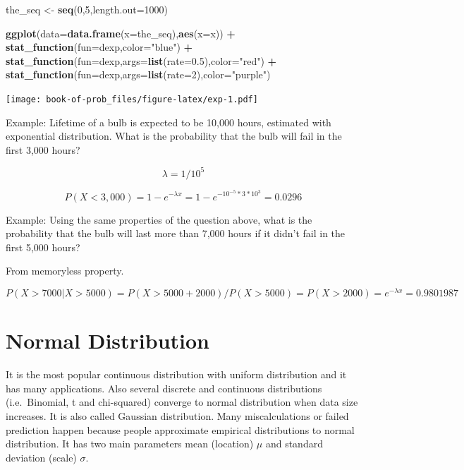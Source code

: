 \documentclass[]{book}
\newenvironment{Shaded}{\begin{snugshade}}{\end{snugshade}}
\newcommand{\DataTypeTok}[1]{\textcolor[rgb]{0.13,0.29,0.53}{#1}}
\newcommand{\DecValTok}[1]{\textcolor[rgb]{0.00,0.00,0.81}{#1}}
\newcommand{\FloatTok}[1]{\textcolor[rgb]{0.00,0.00,0.81}{#1}}
\newcommand{\KeywordTok}[1]{\textcolor[rgb]{0.13,0.29,0.53}{\textbf{#1}}}
\newcommand{\NormalTok}[1]{#1}
\newcommand{\OperatorTok}[1]{\textcolor[rgb]{0.81,0.36,0.00}{\textbf{#1}}}
\newcommand{\StringTok}[1]{\textcolor[rgb]{0.31,0.60,0.02}{#1}}
\theoremstyle{definition}
\theoremstyle{definition}
\theoremstyle{definition}
\theoremstyle{remark}
\begin{document}
\begin{Shaded}
\begin{Highlighting}[]
\NormalTok{the_seq <-}\StringTok{ }\KeywordTok{seq}\NormalTok{(}\DecValTok{0}\NormalTok{,}\DecValTok{5}\NormalTok{,}\DataTypeTok{length.out=}\DecValTok{1000}\NormalTok{)}

\KeywordTok{ggplot}\NormalTok{(}\DataTypeTok{data=}\KeywordTok{data.frame}\NormalTok{(}\DataTypeTok{x=}\NormalTok{the_seq),}\KeywordTok{aes}\NormalTok{(}\DataTypeTok{x=}\NormalTok{x)) }\OperatorTok{+}
\KeywordTok{stat_function}\NormalTok{(}\DataTypeTok{fun=}\NormalTok{dexp,}\DataTypeTok{color=}\StringTok{"blue"}\NormalTok{) }\OperatorTok{+}
\KeywordTok{stat_function}\NormalTok{(}\DataTypeTok{fun=}\NormalTok{dexp,}\DataTypeTok{args=}\KeywordTok{list}\NormalTok{(}\DataTypeTok{rate=}\FloatTok{0.5}\NormalTok{),}\DataTypeTok{color=}\StringTok{"red"}\NormalTok{) }\OperatorTok{+}
\KeywordTok{stat_function}\NormalTok{(}\DataTypeTok{fun=}\NormalTok{dexp,}\DataTypeTok{args=}\KeywordTok{list}\NormalTok{(}\DataTypeTok{rate=}\DecValTok{2}\NormalTok{),}\DataTypeTok{color=}\StringTok{"purple"}\NormalTok{)}
\end{Highlighting}
\end{Shaded}

\texttt{[image: book-of-prob\_files/figure-latex/exp-1.pdf]}

Example: Lifetime of a bulb is expected to be 10,000 hours, estimated
with exponential distribution. What is the probability that the bulb
will fail in the first 3,000 hours?

\[\lambda = 1/10^5\]

\[P(X < 3,000) = 1 - e^{-\lambda x} = 1 - e^{- 10^{-5}*3*10^3} = 0.0296\]

Example: Using the same properties of the question above, what is the
probability that the bulb will last more than 7,000 hours if it didn't
fail in the first 5,000 hours?

From memoryless property.

\[P(X > 7000 | X > 5000) = P(X > 5000 + 2000)/P(X>5000) = P(X > 2000) = e^{-\lambda x} = 0.9801987\]

\hypertarget{normal-distribution}{%
\section{Normal Distribution}\label{normal-distribution}}

It is the most popular continuous distribution with uniform distribution
and it has many applications. Also several discrete and continuous
distributions (i.e.~Binomial, t and chi-squared) converge to normal
distribution when data size increases. It is also called Gaussian
distribution. Many miscalculations or failed prediction happen because
people approximate empirical distributions to normal distribution. It
has two main parameters mean (location) \(\mu\) and standard deviation
(scale) \(\sigma\).
\end{document}
